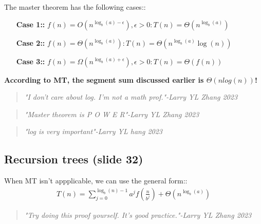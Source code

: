 \documentclass[12pt]{article}
\begin{document}
The master theorem has the following cases::

\begin{itemize}
    \item[\textbf{Case 1::}] $f(n)=O(n^{\log_b(a)-\epsilon}), \epsilon > 0: T(n)=\Theta(n^{\log_b(a)})$
    \item[\textbf{Case 2::}] $f(n)=\Theta(n^{\log_b(a)}): T(n)=\Theta(n^{\log_b(a)}\log(n))$
    \item[\textbf{Case 3::}] $f(n)=\Omega(n^{\log_b(a)+\epsilon}), \epsilon > 0: T(n)=\Theta(f(n))$
\end{itemize}

\textbf{According to MT, the segment sum discussed earlier is $\Theta(nlog(n))$!}

\begin{quote}
    \textit{"I don't care about log. I'm not a math prof."-Larry YL Zhang 2023}
\end{quote}
\begin{quote}
    \textit{"Master theorem is P O W E R"-Larry YL Zhang 2023}
\end{quote}
\begin{quote}
    \textit{"log is very important"-Larry YL hang 2023}
\end{quote}

\subsection*{Recursion trees (slide 32)}
When MT isn't appplicable, we can use the general form::
\begin{align*}
    T(n)=\sum_{j=0}^{\log_b(n)-1}a^j f(\frac{n}{b^j})+\Theta(n^{\log_b(a)})
\end{align*}

\begin{quote}
    \textit{"Try doing this proof yourself. It's good practice."-Larry YL Zhang 2023}
\end{quote}
\end{document}
